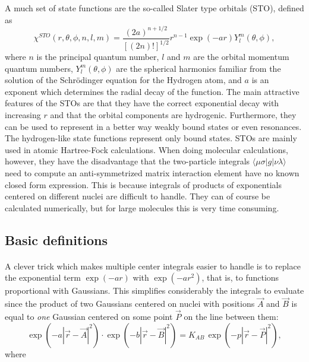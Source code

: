 \documentclass[%
twoside,                 %
final,                   %
10pt]{article}
\begin{document}
A much set of state functions are the so-called 
Slater type orbitals (STO), defined as
\begin{equation}
 \chi^{STO}(r,\theta,\phi,n,l,m) = \frac{(2a)^{n+1/2}}{[(2n)!]^{1/2}}r^{n-1}\exp(-a r) Y^m_l(\theta,\phi),
\end{equation}
where $n$ is the principal quantum number, $l$ and $m$ are the orbital momentum quantum numbers,
$Y^m_l(\theta,\phi)$ are the spherical harmonics familiar from the solution of the Schr\"odinger
equation for the Hydrogen atom, and $a$ is an exponent which determines the radial decay of the
function. The main attractive features of the STOs are that they have the correct exponential decay with
increasing $r$ and that the orbital components are hydrogenic. 
Furthermore, they can be used to represent in a better way weakly bound states or even resonances. The hydrogen-like state functions 
represent only bound states.
STOs are mainly 
used in atomic Hartree-Fock calculations. When doing molecular calculations, however, they have the
disadvantage that the two-particle integrals $\langle\mu\sigma\vert g\vert\nu\lambda\rangle$ need to compute 
an anti-symmetrized matrix interaction element have no known closed form expression. This is because integrals of products
of exponentials centered on different nuclei are difficult to handle. They can of course be calculated
numerically, but for large molecules this is very time consuming.



\subsection*{Basic definitions}

\paragraph{}

A clever trick which makes multiple center integrals easier to handle is to replace the exponential
term $\exp(-a r)$ with $\exp(-a r^2)$, that is, to functions proportional with Gaussians. This simplifies 
considerably the integrals to evaluate since the product of two Gaussians centered on nuclei with positions
$\vec A$ and $\vec B$ is equal to \emph{one} Gaussian centered on some point $\vec P$ on
the line between them:
\begin{equation}
\label{eq:gaussian_product}
 \exp(-a|\vec r - \vec A|^2)\cdot \exp(-b|\vec r - \vec B|^2) = K_{AB}\,\exp(-p|\vec r - \vec P|^2),
\end{equation}
where
\end{document}

